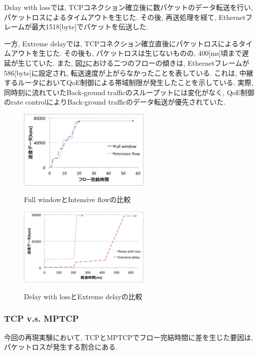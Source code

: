 \documentclass[technicalreport]{ieicej}
\begin{document}
Delay with lossでは, TCPコネクション確立後に数パケットのデータ転送を行い, パケットロスによるタイムアウトを生じた.
その後, 再送処理を経て, Ethernetフレームが最大1518[byte]でパケットを伝送した.

一方, Extreme delayでは, TCPコネクション確立直後にパケットロスによるタイムアウトを生じた.
その後も, パケットロスは生じないものの, 400[ms]頃まで遅延が生じていた.
また, 図\ref{fig:delay_loss}における二つのフローの傾きは, Ethernetフレームが586[byte]に設定され,
転送速度が上がらなかったことを表している.
これは, 中継するルータにおいてQoE制御による帯域制限が発生したことを示している.
実際, 同時刻に流れていたBack-ground trafficのスループットには変化がなく, QoE制御のrate controlによりBack-ground
trafficのデータ転送が優先されていた.

\begin{figure}[!h]
    \begin{center}
    \includegraphics[autoebb, width=180pt]{./img/full_intensive.pdf}
    \caption{Full windowとIntensive flowの比較}
    \label{fig:full_intensive}
    \end{center}
\end{figure}

\begin{figure}[h]
    \begin{center}
    \includegraphics[autoebb, width=180pt]{./img/loss.pdf}
    \caption{Delay with lossとExtreme delayの比較}
    \label{fig:delay_loss}
    \end{center}
\end{figure}

\subsubsection{TCP v.s. MPTCP}
今回の再現実験において, TCPとMPTCPでフロー完結時間に差を生じた要因は, パケットロスが発生する割合にある.
\end{document}
